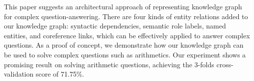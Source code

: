 This paper suggests an architectural approach of representing knowledge graph for complex question-answering. There are four kinds of entity relations added to our knowledge graph: syntactic dependencies, semantic role labels, named entities, and coreference links, which can be effectively applied to answer complex questions. As a proof of concept, we demonstrate how our knowledge graph can be used to solve complex questions such as arithmetics. Our experiment shows a promising result on solving arithmetic questions, achieving the 3-folds cross-validation score of 71.75\%.
